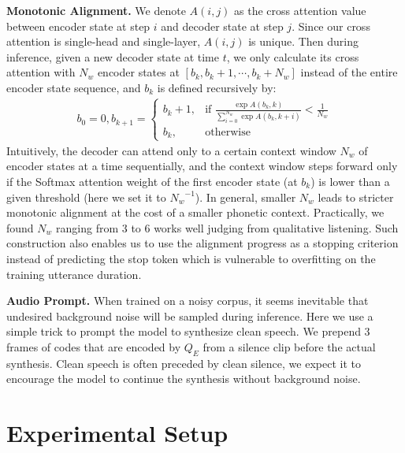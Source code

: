 \documentclass[letterpaper]{article}
\begin{document}
\textbf{Monotonic Alignment.}
We denote $A(i, j)$ as the cross attention value between encoder state at step $i$ and decoder state at step $j$.
Since our cross attention is single-head and single-layer, $A(i, j)$ is unique.
Then during inference, given a new decoder state at time $t$, we only calculate its cross attention with $N_w$ encoder states at $[b_k, b_k+1,\cdots,b_k+N_w]$ instead of the entire encoder state sequence, and $b_k$ is defined recursively by:
\begin{gather}
    b_0 = 0, b_{k+1} = \begin{cases}
    b_k + 1,& \text{if } \frac{\exp{A(b_k, k)}}{\sum_{i=0}^{N_w}\exp{A(b_k, k+i)}} < \frac{1}{N_w}\\
    b_k,              & \text{otherwise}
    \end{cases}
\end{gather}
Intuitively, the decoder can attend only to a certain context window $N_w$ of encoder states at a time sequentially, and the context window steps forward only if the Softmax attention weight of the first encoder state (at $b_k$) is lower than a given threshold (here we set it to ${N_w}^{-1}$).
In general, smaller $N_w$ leads to stricter monotonic alignment at the cost of a smaller phonetic context.
Practically, we found $N_w$ ranging from 3 to 6 works well judging from qualitative listening.
Such construction also enables us to use the alignment progress as a stopping criterion instead of predicting the stop token which is vulnerable to overfitting on the training utterance duration.



\textbf{Audio Prompt.}
When trained on a noisy corpus, it seems inevitable that undesired background noise will be sampled during inference.
Here we use a simple trick to prompt the model to synthesize clean speech.
We prepend 3 frames of codes that are encoded by $Q_{E}$ from a silence clip before the actual synthesis.
Clean speech is often preceded by clean silence, we expect it to encourage the model to continue the synthesis without background noise.

\section{Experimental Setup}
\label{sec:exp-stepup}
\end{document}
